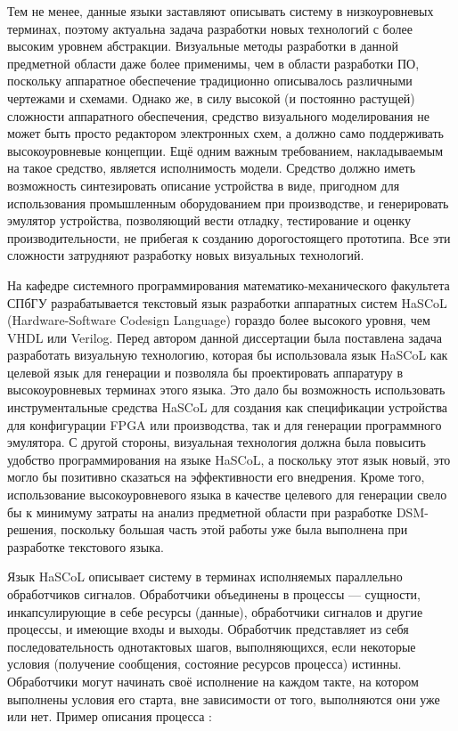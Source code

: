 Тем не менее, данные языки заставляют описывать систему в низкоуровневых терминах, 
поэтому актуальна задача разработки новых технологий с более высоким уровнем абстракции. 
Визуальные методы разработки в данной предметной области даже более применимы, чем 
в области разработки ПО, поскольку аппаратное обеспечение традиционно описывалось 
различными чертежами и схемами. Однако же, в силу высокой (и постоянно растущей) сложности 
аппаратного обеспечения, средство визуального моделирования не может быть просто редактором 
электронных схем, а должно само поддерживать высокоуровневые концепции. Ещё одним 
важным требованием, накладываемым на такое средство, является исполнимость модели. 
Средство должно иметь возможность синтезировать описание устройства в виде, пригодном 
для использования промышленным оборудованием при производстве, и генерировать эмулятор 
устройства, позволяющий вести отладку, тестирование и оценку производительности, не 
прибегая к созданию дорогостоящего прототипа. Все эти сложности затрудняют разработку 
новых визуальных технологий.

На кафедре системного программирования математико-механического факультета СПбГУ разрабатывается 
текстовый язык разработки аппаратных систем HaSCoL (Hardware-Software Codesign Language)
гораздо более высокого уровня, чем VHDL или Verilog. Перед автором данной диссертации 
была поставлена задача разработать визуальную технологию, которая бы использовала 
язык HaSCoL как целевой язык для генерации и позволяла бы проектировать аппаратуру 
в высокоуровневых терминах этого языка. Это дало бы возможность использовать инструментальные 
средства HaSCoL для создания как спецификации устройства для конфигурации FPGA
или производства, так и для генерации программного эмулятора. С другой стороны, визуальная 
технология должна была повысить удобство программирования на языке HaSCoL, а поскольку 
этот язык новый, это могло бы позитивно сказаться на эффективности его внедрения. 
Кроме того, использование высокоуровневого языка в качестве целевого для генерации 
свело бы к минимуму затраты на анализ предметной области при разработке DSM-решения, 
поскольку большая часть этой работы уже была выполнена при разработке текстового языка.

Язык HaSCoL описывает систему  в терминах исполняемых параллельно обработчиков сигналов.
Обработчики объединены в процессы --- сущности, инкапсулирующие в себе ресурсы (данные), 
обработчики сигналов и другие процессы, и имеющие входы и выходы. Обработчик представляет 
из себя последовательность однотактовых шагов, выполняющихся, если некоторые условия 
(получение сообщения, состояние ресурсов процесса) истинны. Обработчики могут начинать 
своё исполнение на каждом такте, на котором выполнены условия его старта, вне зависимости 
от того, выполняются они уже или нет. Пример описания процесса%
:

